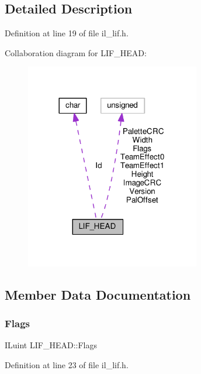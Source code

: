 \subsection{Detailed Description}


Definition at line 19 of file il\+\_\+lif.\+h.



Collaboration diagram for L\+I\+F\+\_\+\+H\+E\+AD\+:
\nopagebreak
\begin{figure}[H]
\begin{center}
\leavevmode
\includegraphics[width=216pt]{de/d8f/structLIF__HEAD__coll__graph}
\end{center}
\end{figure}


\subsection{Member Data Documentation}
\mbox{\label{structLIF__HEAD_ae1b665f1ce64aafe33b49925b1af98f4}} 
\subsubsection{\texorpdfstring{Flags}{Flags}}
{\footnotesize\ttfamily I\+Luint L\+I\+F\+\_\+\+H\+E\+A\+D\+::\+Flags}



Definition at line 23 of file il\+\_\+lif.\+h.

\mbox{\label{structLIF__HEAD_a465ed1a4e7fc05ee3bcd128d10972cb2}} 
